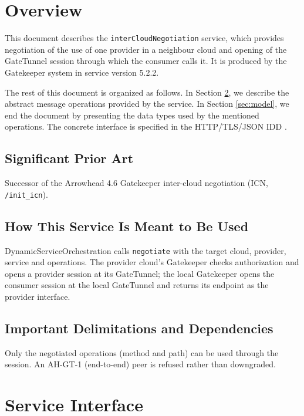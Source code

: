 \documentclass[a4paper]{arrowhead}
\begin{document}
\section{Overview}
\label{sec:overview}

This document describes the \texttt{inter\allowbreak{}Cloud\allowbreak{}Negotiation} service, which provides negotiation of the use of one provider in a neighbour cloud and opening of the GateTunnel session through which the consumer calls it.
It is produced by the Gatekeeper system \cite{gk-sysd} in service version 5.2.2.

The rest of this document is organized as follows.
In Section \ref{sec:operations}, we describe the abstract message operations provided by the service.
In Section \ref{sec:model}, we end the document by presenting the data types used by the mentioned operations.
The concrete interface is specified in the HTTP/TLS/JSON IDD \cite{gk-interCloudNegotiation-http-idd}.

\subsection{Significant Prior Art}

Successor of the Arrowhead 4.6 Gatekeeper inter-cloud negotiation (ICN, \texttt{/\allowbreak{}init\_\allowbreak{}icn}).

\subsection{How This Service Is Meant to Be Used}

Dynamic\allowbreak{}Service\allowbreak{}Orchestration calls \texttt{negotiate} with the target cloud, provider, service and operations. The provider cloud's Gatekeeper checks authorization and opens a provider session at its GateTunnel; the local Gatekeeper opens the consumer session at the local GateTunnel and returns its endpoint as the provider interface.

\subsection{Important Delimitations and Dependencies}
\label{sec:delimitations}

Only the negotiated operations (method and path) can be used through the session. An AH-GT-1 (end-to-end) peer is refused rather than downgraded.

\newpage

\section{Service Interface}
\label{sec:operations}
\end{document}
